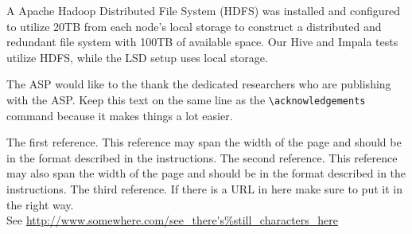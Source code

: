 \documentclass[11pt,twoside]{article}
\begin{document}
A Apache Hadoop Distributed File System (HDFS) was installed and configured to utilize 20TB from each node's local storage to construct a distributed and redundant file system with 100TB of available space.  Our Hive and Impala tests utilize HDFS, while the LSD setup uses local storage.  


\acknowledgements The ASP would like to the thank the dedicated researchers who are publishing with the ASP.  Keep this text on the same line as the \verb"\acknowledgements" command because it makes things a lot easier.


\begin{thebibliography}{}
The first reference.  This reference may span the width of the page and should be in the format described in the instructions.
The second reference.  This reference may also span the width of the page and should be in the format described in the instructions.
The third reference.  If there is a URL in here make sure to put it in the right way.\\
See {\footnotesize \url{http://www.somewhere.com/see_there's%still_characters_here}}
\end{thebibliography}
\end{document}
